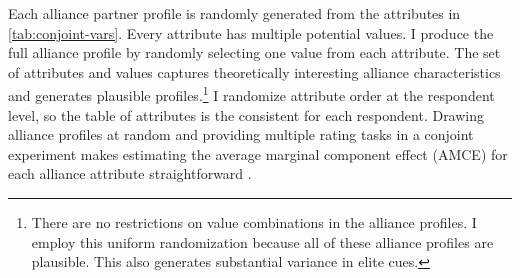 \documentclass[12pt]{article}
\begin{document}
Each alliance partner profile is randomly generated from the attributes in \autoref{tab:conjoint-vars}.
Every attribute has multiple potential values.
I produce the full alliance profile by randomly selecting one value from each attribute. 
The set of attributes and values captures theoretically interesting alliance characteristics and generates plausible profiles.\footnote{There are no restrictions on value combinations in the alliance profiles. I employ this uniform randomization because all of these alliance profiles are plausible. This also generates substantial variance in elite cues.}
I randomize attribute order at the respondent level, so the table of attributes is the consistent for each respondent. 
Drawing alliance profiles at random and providing multiple rating tasks in a conjoint experiment makes estimating the average marginal component effect (AMCE) for each alliance attribute straightforward \citep{Hainmuelleretal2014}. 
\end{document}
